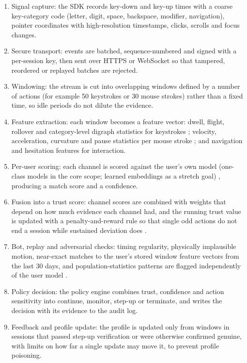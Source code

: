 \documentclass[10pt,letterpaper]{article}
\begin{document}
\begin{enumerate}[label=\arabic*.,leftmargin=18pt]
  \item Signal capture: the SDK records key-down and key-up times with a coarse key-category code (letter, digit, space, backspace, modifier, navigation), pointer coordinates with high-resolution timestamps, clicks, scrolls and focus changes.
  \item Secure transport: events are batched, sequence-numbered and signed with a per-session key, then sent over HTTPS or WebSocket so that tampered, reordered or replayed batches are rejected.
  \item Windowing: the stream is cut into overlapping windows defined by a number of actions (for example 50 keystrokes or 30 mouse strokes) rather than a fixed time, so idle periods do not dilute the evidence.
  \item Feature extraction: each window becomes a feature vector: dwell, flight, rollover and category-level digraph statistics for keystrokes \cite{killourhy2009}; velocity, acceleration, curvature and pause statistics per mouse stroke \cite{ahmed2007,shen2013}; and navigation and hesitation features for interaction.
  \item Per-user scoring: each channel is scored against the user's own model (one-class models in the core scope; learned embeddings as a stretch goal) \cite{killourhy2009,acien2022,antal2021}, producing a match score and a confidence.
  \item Fusion into a trust score: channel scores are combined with weights that depend on how much evidence each channel had, and the running trust value is updated with a penalty-and-reward rule so that single odd actions do not end a session while sustained deviation does \cite{mondal2017}.
  \item Bot, replay and adversarial checks: timing regularity, physically implausible motion, near-exact matches to the user's stored window feature vectors from the last 30 days, and population-statistics patterns are flagged independently of the user model \cite{tey2013,serwadda2013}.
  \item Policy decision: the policy engine combines trust, confidence and action sensitivity into continue, monitor, step-up or terminate, and writes the decision with its evidence to the audit log.
  \item Feedback and profile update: the profile is updated only from windows in sessions that passed step-up verification or were otherwise confirmed genuine, with limits on how far a single update may move it, to prevent profile poisoning.
\end{enumerate}
\end{document}
